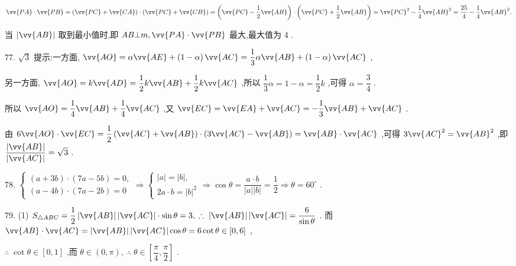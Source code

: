 $\vv{PA} \cdot  \vv{PB} = \left( {\vv{PC} + \vv{CA}}\right)  \cdot  \left( {\vv{PC} + \vv{CB}}\right)  = \left( {\vv{PC} - \dfrac{1}{2}\vv{AB}}\right)  \cdot  \left( {\vv{PC} + \dfrac{1}{2}\vv{AB}}\right)  = {\vv{PC}}^{2} - \dfrac{1}{4}{\vv{AB}}^{2} = \dfrac{25}{4} - \dfrac{1}{4}{\vv{AB}}^{2}.$

当 $\left| \vv{AB}\right|$ 取到最小值时,即 ${AB} \bot  m,\vv{PA} \cdot  \vv{PB}$ 最大,最大值为 4 .

77. $\sqrt{3}$ 提示:一方面, $\vv{AO} = \alpha \vv{AE} + \left( {1 - \alpha }\right) \vv{AC} = \dfrac{1}{3}\alpha \vv{AB} + \left( {1 - \alpha }\right) \vv{AC}$ ,

另一方面, $\vv{AO} = k\vv{AD} = \dfrac{1}{2}k\vv{AB} + \dfrac{1}{2}k\vv{AC}$ ,所以 $\dfrac{1}{3}\alpha  = 1 - \alpha  = \dfrac{1}{2}k$ ,可得 $\alpha  = \dfrac{3}{4}$ .

所以 $\vv{AO} = \dfrac{1}{4}\vv{AB} + \dfrac{1}{4}\vv{AC}$ ,又 $\vv{EC} = \vv{EA} + \vv{AC} =  - \dfrac{1}{3}\vv{AB} + \vv{AC}$ .

由 $6\vv{AO} \cdot  \vv{EC} = \dfrac{1}{2}\left( {\vv{AC} + \vv{AB}}\right)  \cdot  \left( {3\vv{AC} - \vv{AB}}\right)  = \vv{AB} \cdot  \vv{AC}$ ,可得 $3{\vv{AC}}^{2} = {\vv{AB}}^{2}$ ,即 $\dfrac{\left| \vv{AB}\right| }{\left| \vv{AC}\right| } = \sqrt{3}$ .

78. $\left\{  {\begin{array}{l} \left( {a + {3b}}\right)  \cdot  \left( {{7a} - {5b}}\right)  = 0, \\  \left( {a - {4b}}\right)  \cdot  \left( {{7a} - {2b}}\right)  = 0 \end{array} \Rightarrow  \left\{  {\begin{array}{l} \left| a\right|  = \left| b\right| , \\  {2a} \cdot  b = {\left| b\right| }^{2} \end{array} \Rightarrow  \cos \theta  = \dfrac{a \cdot  b}{\left| a\right| \left| b\right| } = \dfrac{1}{2} \Rightarrow  \theta  = {60}^{ \circ  }}\right. }\right.$ .

79. (1) ${S}_{\bigtriangleup {ABC}} = \dfrac{1}{2}\left| \vv{AB}\right| \left| \vv{AC}\right|  \cdot  \sin \theta  = 3,\;\therefore \;\left| \vv{AB}\right| \left| \vv{AC}\right|  = \dfrac{6}{\sin \theta }$ . 而 $\vv{AB} \cdot  \vv{AC} = \left| \vv{AB}\right| \left| \vv{AC}\right| \cos \theta  = 6\cot \theta  \in  \left\lbrack  {0,6}\right\rbrack$ ,

$\therefore \;\cot \theta  \in  \left\lbrack  {0,1}\right\rbrack$ ,而 $\theta  \in  \left( {0,\pi }\right) ,\;\therefore \;\theta  \in  \left\lbrack  {\dfrac{\pi }{4},\dfrac{\pi }{2}}\right\rbrack$ .

